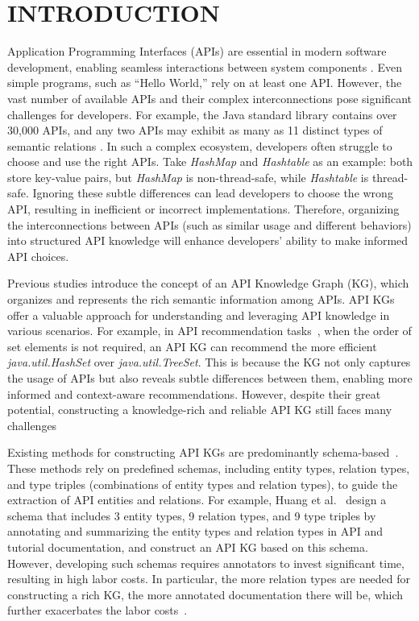 \section{INTRODUCTION}
Application Programming Interfaces (APIs) are essential in modern software development, enabling seamless interactions between system components \cite{raatikainen2021state, wu2024future, lercher2024microservice}.
Even simple programs, such as ``Hello World,'' rely on at least one API.
However, the vast number of available APIs and their complex interconnections pose significant challenges for developers.
For example, the Java standard library contains over 30,000 APIs, and any two APIs may exhibit as many as 11 distinct types of semantic relations \cite{javaapi, huang2022se}.
In such a complex ecosystem, developers often struggle to choose and use the right APIs.
Take \textit{HashMap} and \textit{Hashtable} as an example:
both store key-value pairs, but \textit{HashMap} is non-thread-safe, while \textit{Hashtable} is thread-safe.
Ignoring these subtle differences can lead developers to choose the wrong API, resulting in inefficient or incorrect implementations.
Therefore, organizing the interconnections between APIs (such as similar usage and different behaviors) into structured API knowledge will enhance developers' ability to make informed API choices.

Previous studies \cite{Manual, Huang2018APIMR, Liu2020GeneratingCB} introduce the concept of an API Knowledge Graph (KG), which organizes and represents the rich semantic information among APIs.
API KGs offer a valuable approach for understanding and leveraging API knowledge in various scenarios. 
For example, in API recommendation tasks~\cite{Liu2023RecommendingAA, Peng2021RevisitingBA, Huang2018APIMR}, when the order of set elements is not required, an API KG can recommend the more efficient \textit{java.util.HashSet} over \textit{java.util.TreeSet}.
This is because the KG not only captures the usage of APIs but also reveals subtle differences between them, enabling more informed and context-aware recommendations.
However, despite their great potential, constructing a knowledge-rich and reliable API KG still faces many challenges

Existing methods for constructing API KGs are predominantly schema-based~\cite{huang2022se, yanbang1, Ren2020APIMisuseDD}.
These methods rely on predefined schemas, including entity types, relation types, and type triples (combinations of entity types and relation types), to guide the extraction of API entities and relations.
For example, Huang et al.~\cite{yanbang1} design a schema that includes 3 entity types, 9 relation types, and 9 type triples by annotating and summarizing the entity types and relation types in API and tutorial documentation, and construct an API KG based on this schema.
However, developing such schemas requires annotators to invest significant time, resulting in high labor costs.
In particular, the more relation types are needed for constructing a rich KG, the more annotated documentation there will be, which further exacerbates the labor costs~\cite{yanbang2}.

